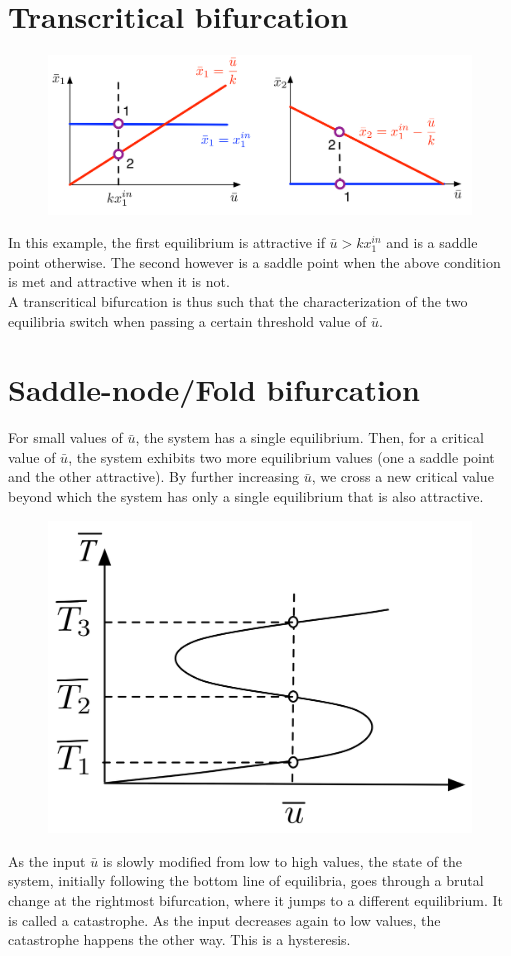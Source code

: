 \documentclass[12pt, openany]{report}
\theoremstyle{definition}
\begin{document}
\section{Transcritical bifurcation}
\begin{figure}[H]
    \centering
    \includegraphics[width = .5\textwidth]{img/transcritical.png}
\end{figure}
In this example, the first equilibrium is attractive if \(\bar u>kx_1^{in}\) and is a saddle point otherwise. The second however is a saddle point when the above condition is met and attractive when it is not.\\

A transcritical bifurcation is thus such that the characterization of the two equilibria switch when passing a certain threshold value of \(\bar u\).
\section{Saddle-node/Fold bifurcation}
For small values of \(\bar u\), the system has a single equilibrium. Then, for a critical value of \(\bar u\), the system exhibits two more equilibrium values (one a saddle point and the other attractive). By further increasing \(\bar u\), we cross a new critical value beyond which the system has only a single equilibrium that is also attractive. \\
\begin{figure}[H]
    \centering
    \includegraphics[width = .3\textwidth]{img/fold_bif.png}
\end{figure}
As the input \(\bar u\) is slowly modified from low to high values, the state of the system, initially following the bottom line of equilibria, goes through a brutal change at the rightmost bifurcation, where it jumps to a different equilibrium. It is called a catastrophe. As the input decreases again to low values, the catastrophe happens the other way. This is a hysteresis.
\end{document}
